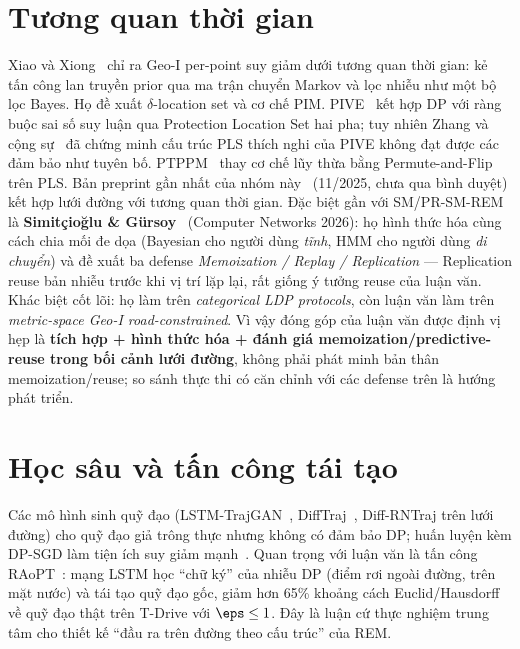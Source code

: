 \section{Tương quan thời gian}

Xiao và Xiong~\cite{xiao2015protecting} chỉ ra Geo-I per-point suy giảm dưới
tương quan thời gian: kẻ tấn công lan truyền prior qua ma trận chuyển Markov và
lọc nhiễu như một bộ lọc Bayes. Họ đề xuất $\delta$-location set và cơ chế PIM.
PIVE~\cite{yu2017pive} kết hợp DP với ràng buộc sai số suy luận qua Protection
Location Set hai pha; tuy nhiên Zhang và cộng sự~\cite{zhang2021pive} đã chứng
minh cấu trúc PLS thích nghi của PIVE không đạt được các đảm bảo như tuyên bố.
PTPPM~\cite{cao2024ptppm} thay cơ chế lũy thừa bằng Permute-and-Flip trên PLS.
Bản preprint gần nhất của nhóm này~\cite{min2025road} (11/2025, chưa qua bình
duyệt) kết hợp lưới đường với tương quan thời gian. Đặc biệt gần với SM/PR-SM-REM
là \textbf{Simitçioğlu \& Gürsoy}~\cite{simitcioglu2026continuous} (Computer
Networks 2026): họ hình thức hóa cùng cách chia mối đe dọa (Bayesian cho người
dùng \emph{tĩnh}, HMM cho người dùng \emph{di chuyển}) và đề xuất ba defense
\emph{Memoization / Replay / Replication} --- Replication reuse bản nhiễu trước
khi vị trí lặp lại, rất giống ý tưởng reuse của luận văn. Khác biệt cốt lõi: họ
làm trên \emph{categorical LDP protocols}, còn luận văn làm trên \emph{metric-space
Geo-I road-constrained}. Vì vậy đóng góp của luận văn được định vị hẹp là
\textbf{tích hợp + hình thức hóa + đánh giá memoization/predictive-reuse trong
bối cảnh lưới đường}, không phải phát minh bản thân memoization/reuse; so sánh
thực thi có căn chỉnh với các defense trên là hướng phát triển.

\section{Học sâu và tấn công tái tạo}

Các mô hình sinh quỹ đạo (LSTM-TrajGAN~\cite{rao2020lstm},
DiffTraj~\cite{zhu2023difftraj}, Diff-RNTraj trên lưới đường) cho quỹ đạo giả
trông thực nhưng không có đảm bảo DP; huấn luyện kèm DP-SGD làm tiện ích suy giảm
mạnh~\cite{buchholz2024sok}. Quan trọng với luận văn là tấn công
RAoPT~\cite{buchholz2022raopt}: mạng LSTM học ``chữ ký'' của nhiễu DP (điểm rơi
ngoài đường, trên mặt nước) và tái tạo quỹ đạo gốc, giảm hơn 65\% khoảng cách
Euclid/Hausdorff về quỹ đạo thật trên T-Drive với $\eps \le 1$. Đây là luận cứ
thực nghiệm trung tâm cho thiết kế ``đầu ra trên đường theo cấu trúc'' của REM.

